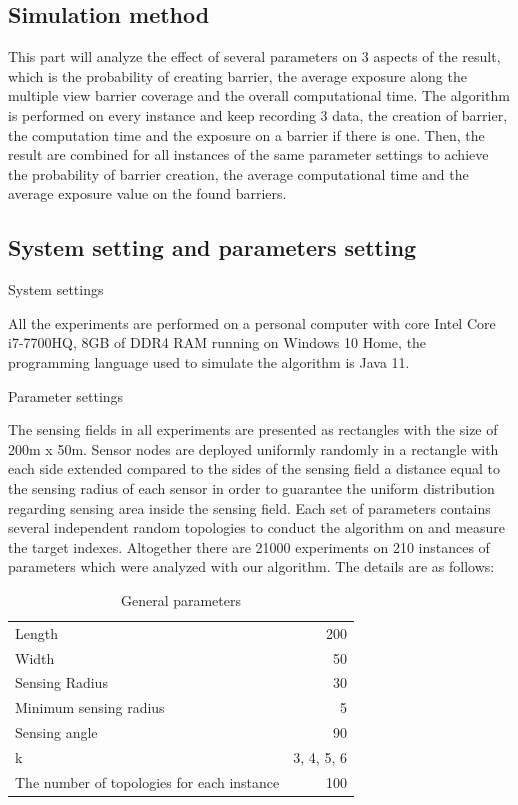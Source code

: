
\subsection{Simulation method}

This part will analyze the effect of several parameters on 3 aspects of the result, which is the probability of creating barrier, the average exposure along the multiple view barrier coverage and the overall computational time. The algorithm is performed on every instance and keep recording 3 data, the creation of barrier, the computation time and the exposure on a barrier if there is one. Then, the result are combined for all instances of the same parameter settings to achieve the probability of barrier creation, the average computational time and the average exposure value on the found barriers.

\subsection{System setting and parameters setting}
System settings

All the experiments are performed on a personal computer with core Intel Core i7-7700HQ, 8GB of DDR4 RAM running on Windows 10 Home, the programming language used to simulate the algorithm is Java 11.

Parameter settings

The sensing fields in all experiments are presented as rectangles with the size of 200m x 50m. Sensor nodes are deployed uniformly randomly in a rectangle with each side extended compared to the sides of the sensing field a distance equal to the sensing radius of each sensor in order to guarantee the uniform distribution regarding sensing area inside the sensing field. Each set of parameters contains several independent random topologies to conduct the algorithm on and measure the target indexes. Altogether there are 21000 experiments on 210 instances of parameters which were analyzed with our algorithm. The details are as follows:
\begin{table}[h!]
	\centering
	\begin{tabular}{l | r}
		Length & 200 \\
		Width & 50 \\
		Sensing Radius & 30 \\
		Minimum sensing radius & 5 \\
		Sensing angle & 90 \\
		k & 3, 4, 5, 6 \\
		The number of topologies for each instance & 100
	\end{tabular}
	\caption{General parameters}
\end{table}

